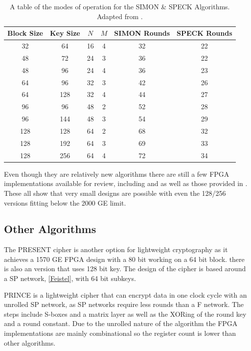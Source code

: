 \documentclass[12pt,twoside,a4paper]{report}
\begin{document}
	\begin{table}[H]
	\centering
	\begin{tabular}{||c|c|c|c|c|c||}
		\hline \hline
		Block Size & Key Size & $N$ & $M$ & SIMON Rounds & SPECK Rounds \\
		\hline \hline
		32 & 64 & 16 & 4 & 32 & 22 \\
		\hline
		48 & 72 & 24 & 3 & 36 & 22 \\
		48 & 96 & 24 & 4 & 36 & 23 \\
		\hline
		64 & 96 & 32 & 3 & 42 & 26 \\
		64 & 128 & 32 & 4 & 44 & 27 \\
		\hline
		96 & 96 & 48 & 2 & 52 & 28 \\
		96 & 144 & 48 & 3 & 54 & 29 \\
		\hline
		128 & 128 & 64 & 2 & 68 & 32 \\
		128 & 192 & 64 & 3 & 69 & 33 \\
 		128 & 256 & 64 & 4 & 72 & 34 \\
		\hline \hline
	\end{tabular}
	\caption{A table of the modes of operation for the SIMON \& SPECK Algorithms. Adapted from \cite{Beaulieu2015}.}
	\label{table:S+S}
	\end{table}    
    
	Even though they are relatively new algorithms there are still a few FPGA implementations available for review, including \cite{Aysu2014} and \cite{Shahverdi2015} as well as those provided in \cite{Beaulieu2013}. These all show that very small designs are possible with even the 128/256 versions fitting below the 2000 GE limit.
    
	\subsection{Other Algorithms}
	The PRESENT cipher is another option for lightweight cryptography as it achieves a 1570 GE FPGA design with a 80 bit working on a 64 bit block. there is also an version that uses 128 bit key. The design of the cipher is based around a SP network, \autoref{Feistel}, with 64 bit subkeys.
    
	PRINCE is a lightweight cipher that can encrypt data in one clock cycle with an unrolled SP network, as SP networks require less rounds than a F network. The steps include S-boxes and a matrix layer as well as the XORing of the round key and a round constant. Due to the unrolled nature of the algorithm the FPGA implementations are mainly combinational so the register count is lower than other algorithms.
    
\end{document}
